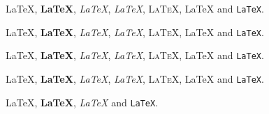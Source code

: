 \documentclass[11pt]{article}
\begin{document}
{\small \LaTeX, \textbf{\LaTeX}, \textit{\LaTeX}, \textsl{\LaTeX}, \textsc{\LaTeX}, \textsf{\LaTeX} and \texttt{\LaTeX}.\par}
{\footnotesize \LaTeX, \textbf{\LaTeX}, \textit{\LaTeX}, \textsl{\LaTeX}, \textsc{\LaTeX}, \textsf{\LaTeX} and \texttt{\LaTeX}.\par}
{\scriptsize \LaTeX, \textbf{\LaTeX}, \textit{\LaTeX}, \textsl{\LaTeX}, \textsc{\LaTeX}, \textsf{\LaTeX} and \texttt{\LaTeX}.\par}
{\normalsize \LaTeX, \textbf{\LaTeX}, \textit{\LaTeX}, \textsl{\LaTeX}, \textsc{\LaTeX}, \textsf{\LaTeX} and \texttt{\LaTeX}.\par}
{\tiny \LaTeX, \textbf{\LaTeX}, \textit{\LaTeX} and \texttt{\LaTeX}.\par}
\end{document}
